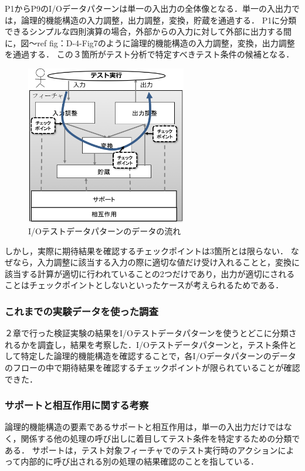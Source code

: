 \documentclass[10pt,a4j]{jarticle}
\begin{document}
P1からP9のI/Oデータパターンは単一の入出力の全体像となる．単一の入出力では，論理的機能構造の入力調整，出力調整，変換，貯蔵を通過する．
P1に分類できるシンプルな四則演算の場合，外部からの入力に対して外部に出力する間に，図〜ref {fig：D-4-Fig7}のように論理的機能構造の入力調整，変換，出力調整を通過する．
この３箇所がテスト分析で特定すべきテスト条件の候補となる．
 \begin{figure}[htbp]
 \begin{center}
 \includegraphics[width=7cm]{./image/D-4-Fig7.png}
 \caption{I/Oテストデータパターンのデータの流れ}
 \label{fig:D-4-Fig7}
 \end{center}
 \end{figure}

しかし，実際に期待結果を確認するチェックポイントは3箇所とは限らない．
なぜなら，入力調整に該当する入力の際に適切な値だけ受け入れることと，変換に該当する計算が適切に行われていることの2つだけであり，出力が適切にされることはチェックポイントとしないといったケースが考えられるためである．

\subsubsection{これまでの実験データを使った調査}
２章で行った検証実験の結果をI/Oテストデータパターンを使うとどこに分類されるかを調査し，結果を考察した．I/Oテストデータパターンと，テスト条件として特定した論理的機能構造を確認することで，各I/Oデータパターンのデータのフローの中で期待結果を確認するチェックポイントが限られていることが確認できた．

\subsubsection{サポートと相互作用に関する考察}
論理的機能構造の要素であるサポートと相互作用は，単一の入出力だけではなく，関係する他の処理の呼び出しに着目してテスト条件を特定するための分類である．
サポートは，テスト対象フィーチャでのテスト実行時のアクションによって内部的に呼び出される別の処理の結果確認のことを指している．
\end{document}
